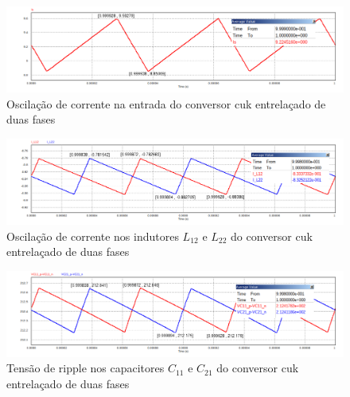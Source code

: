 \documentclass[
	12pt,				%
	openany,
	onseside,
	a4paper,			%
	english,			%
	french,				%
	spanish,			%
	brazil,				%
	]{abntex2}
\begin{document}
\begin{figure}[htb]%
	\captionsetup{justification=centering}
	\centering
		\includegraphics[width= \linewidth]{cuk_inter_ripp_I_S}
		\caption{Oscilação de corrente na entrada do conversor cuk entrelaçado de duas fases}
		\label{fig:cuk_inter_ripp_I_S}
\end{figure}

\begin{figure}[htb]%
	\captionsetup{justification=centering}
	\centering
		\includegraphics[width= \linewidth]{cuk_inter_ripp_I_LX2}
		\caption{Oscilação de corrente nos indutores $L_{12}$ e $L_{22}$ do conversor cuk entrelaçado de duas fases}
		\label{fig:cuk_inter_ripp_I_L2}
\end{figure}

\begin{figure}[H]%
	\captionsetup{justification=centering}
	\centering
		\includegraphics[width= \linewidth]{cuk_inter_ripp_V_CX1}
		\caption{Tensão de ripple nos capacitores $C_{11}$ e $C_{21}$ do conversor cuk entrelaçado de duas fases}
		\label{fig:cuk_inter_ripp_V_C1}
\end{figure}

\end{document}
